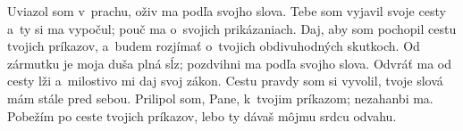 Uviazol som v~prachu,
oživ ma podľa svojho slova.
\versseparator
Tebe som vyjavil svoje cesty a~ty si ma vypočul;
pouč ma o~svojich prikázaniach.
\versseparator
Daj, aby som pochopil cestu tvojich príkazov,
a~budem rozjímať o~tvojich obdivuhodných skutkoch.
\versseparator
Od zármutku je moja duša plná sĺz;
pozdvihni ma podľa svojho slova.
\versseparator
Odvráť ma od cesty lži
a~milostivo mi daj svoj zákon.
\versseparator
Cestu pravdy som si vyvolil,
tvoje slová mám stále pred sebou.
\versseparator
Prilipol som, Pane, k~tvojim príkazom;
nezahanbi ma.
\versseparator
Pobežím po ceste tvojich príkazov,
lebo ty dávaš môjmu srdcu odvahu.
